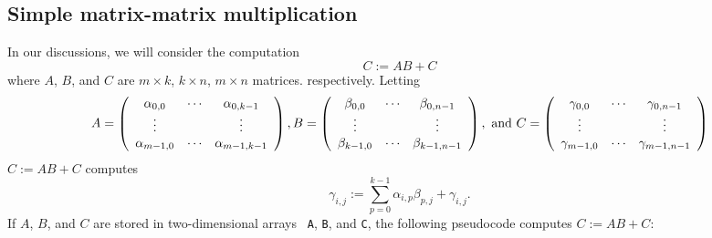 \subsection{Simple matrix-matrix multiplication}

In our discussions, we will consider the computation
$$C:=AB + C$$
where $A$, $B$, and $C$ are $m\times k$, $k\times n$, $m\times n$  matrices.
respectively. 
Letting 
{\footnotesize%
\[
A = 
\left( \begin{array}{c c c c}
\alpha_{0,0} & \cdots & \alpha_{0,k-1} \\
\vdots &  & \vdots \\
\alpha_{m-1,0} & \cdots & \alpha_{m-1,k-1} \\
\end{array}
\right),
B = 
\left( \begin{array}{c c c c}
\beta_{0,0} & \cdots & \beta_{0,n-1} \\
\vdots &  & \vdots \\
\beta_{k-1,0} & \cdots & \beta_{k-1,n-1} \\
\end{array}
\right), \mbox{~and~}
C = 
\left( \begin{array}{c c c c}
\gamma_{0,0} & \cdots & \gamma_{0,n-1} \\
\vdots &  & \vdots \\
\gamma_{m-1,0} & \cdots & \gamma_{m-1,n-1} \\
\end{array}
\right)
\]%
}
$ C := A B + C $ computes
\[
\gamma_{i,j} := \sum_{p=0}^{k-1} \alpha_{i,p} \beta_{p,j} +
\gamma_{i,j}.
\]
If $ A $, $ B $, and $ C $ are stored  in two-dimensional arrays {\tt
  A}, {\tt B}, and {\tt C}, 
the following pseudocode computes $ C := A B + C $:

